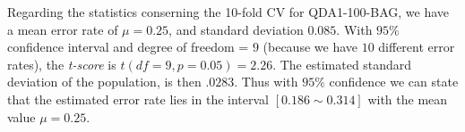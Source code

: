 \documentclass[a4paper,12pt]{article}
\begin{document}
Regarding the statistics conserning the 10-fold CV for QDA1-100-BAG, we have a mean error rate of $\mu = 0.25$, and standard deviation $0.085$.  With $95\%$ confidence interval and degree of freedom = $9$ (because we have $10$ different error rates), the \emph{t-score} is $t(df=9,p=0.05) = 2.26$. The estimated standard deviation of the population, is then $.0283$. Thus with $95\%$ confidence we can state that the estimated error rate lies in the interval  $[0.186 \sim 0.314]$ with the mean value $\mu = 0.25$.
\end{document}
